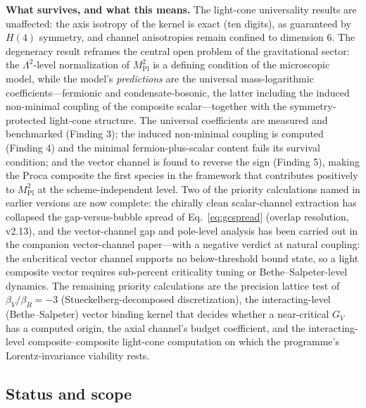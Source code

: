 \documentclass[11pt,a4paper]{article}
\begin{document}
\textbf{What survives, and what this means.}
The light-cone universality results are unaffected: the axis
isotropy of the kernel is exact (ten digits), as guaranteed by
$H(4)$ symmetry, and channel anisotropies remain confined to
dimension 6.
The degeneracy result reframes the central open problem of the
gravitational sector: the $\Lambda^2$-level normalization of
$M_{\mathrm{Pl}}^2$ is a defining condition of the microscopic
model, while the model's \emph{predictions} are the universal
mass-logarithmic coefficients---fermionic and condensate-bosonic,
the latter including the induced non-minimal coupling of the
composite scalar---together with the symmetry-protected light-cone
structure.
The universal coefficients are measured and benchmarked
(Finding 3); the induced non-minimal coupling is computed
(Finding 4) and the minimal fermion-plus-scalar content fails its
survival condition; and the vector channel is found to reverse the
sign (Finding 5), making the Proca composite the first species in
the framework that contributes positively to $M_{\mathrm{Pl}}^2$
at the scheme-independent level.
Two of the priority calculations named in earlier versions are now
complete: the chirally clean scalar-channel extraction has
collapsed the gap-versus-bubble spread of Eq.~\eqref{eq:gcspread}
(overlap resolution, v2.13), and the vector-channel gap and
pole-level analysis has been carried out in the companion
vector-channel paper---with a negative verdict at natural
coupling: the subcritical vector channel supports no
below-threshold bound state, so a light composite vector requires
sub-percent criticality tuning or Bethe--Salpeter-level dynamics.
The remaining priority calculations are the precision lattice test
of $\beta_V/\beta_B = -3$ (Stueckelberg-decomposed
discretization), the interacting-level (Bethe--Salpeter) vector
binding kernel that decides whether a near-critical $G_V$ has a
computed origin, the axial channel's budget coefficient, and the
interacting-level composite--composite light-cone computation on
which the programme's Lorentz-invariance viability rests.

\subsection{Status and scope}
\end{document}

